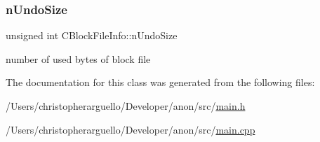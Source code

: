 \subsubsection{\texorpdfstring{n\+Undo\+Size}{nUndoSize}}
{\footnotesize\ttfamily unsigned int C\+Block\+File\+Info\+::n\+Undo\+Size}



number of used bytes of block file 



The documentation for this class was generated from the following files\+:\begin{DoxyCompactItemize}
\item 
/\+Users/christopherarguello/\+Developer/anon/src/\mbox{\hyperlink{main_8h}{main.\+h}}\item 
/\+Users/christopherarguello/\+Developer/anon/src/\mbox{\hyperlink{main_8cpp}{main.\+cpp}}\end{DoxyCompactItemize}
